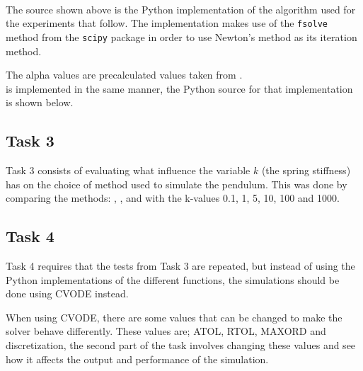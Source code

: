 \documentclass{article}
\begin{document}
      \

      \noindent
      The source shown above is the Python implementation of the 
      algorithm used for the experiments that follow. The implementation makes
      use of the \texttt{fsolve} method from the \texttt{scipy} package in
      order to use Newton's method as its iteration method.

      The alpha values are precalculated values taken from . \\

      \noindent
       is implemented in the same manner, the Python source for
      that implementation is shown below.

      \newpage

      

    \newpage
    \subsection{Task 3}

      Task 3 consists of evaluating what influence the variable $k$ (the
      spring stiffness) has on the choice of method used to simulate the
      pendulum. This was done by comparing the methods: \EE{}, , 
      and  with the k-values 0.1, 1, 5, 10, 100 and 1000.

      
      
      
      


    \newpage
    \subsection{Task 4}

      Task 4 requires that the tests from Task 3 are repeated, but
      instead of using the Python implementations of the different functions,
      the simulations should be done using CVODE instead.

      

      \noindent
      When using CVODE, there are some values that can be changed to make the
      solver behave differently. These values are; ATOL, RTOL, MAXORD and
      discretization, the second part of the task involves changing these
      values and see how it affects the output and performance of the
      simulation.
\end{document}
